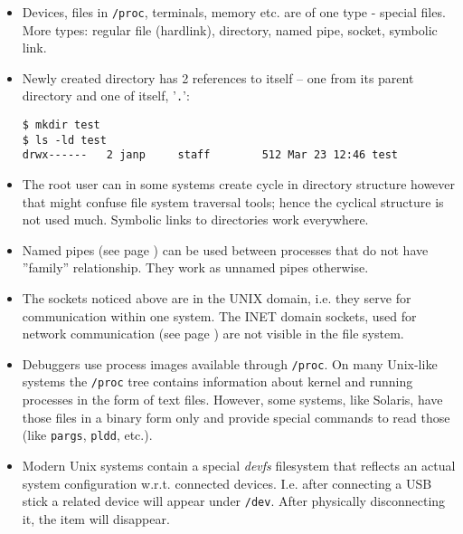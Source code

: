 \begin{itemize}
\item Devices, files in \texttt{/proc}, terminals, memory etc. are of one type
- special files. More types: regular file (hardlink), directory, named pipe,
socket, symbolic link.
\item Newly created directory has 2 references to itself -- one from its parent
directory and one of itself, '\texttt{.}':

\begin{verbatim}
$ mkdir test
$ ls -ld test
drwx------   2 janp     staff        512 Mar 23 12:46 test
\end{verbatim}

\item The root user can in some systems create cycle in directory structure
however that might confuse file system traversal tools; hence the cyclical
structure is not used much. Symbolic links to directories work everywhere.
\item Named pipes (see page \pageref{MKFIFO}) can be used between processes
that do not have ''family'' relationship.  They work as unnamed pipes otherwise.
\item The sockets noticed above are in the UNIX domain, i.e. they serve for
communication within one system. The INET domain sockets, used for network
communication (see page \pageref{NETWORKING}) are not visible in the file
system.
\item Debuggers use process images available through \texttt{/proc}.
On many Unix-like systems the \texttt{/proc} tree contains information about
kernel and running processes in the form of text files.  However, some systems,
like Solaris, have those files in a binary form only and provide special
commands to read those (like \texttt{pargs}, \texttt{pldd}, etc.).
\item Modern Unix systems contain a special \emph{devfs} filesystem that
reflects an actual system configuration w.r.t. connected devices. I.e. after
connecting a USB stick a related device will appear under \texttt{/dev}. After
physically disconnecting it, the item will disappear.
\end{itemize}

\endinput
